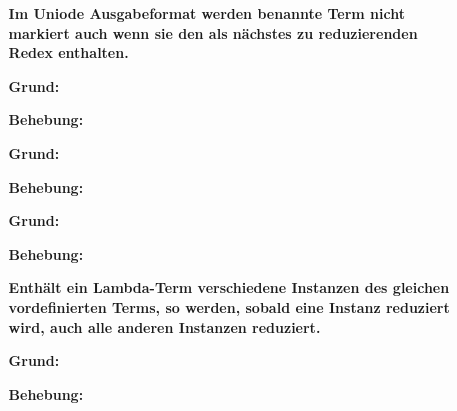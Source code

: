 \documentclass[parskip=full,11pt,openany]{scrreprt}
\begin{document}
\begin{itemize}[itemsep=3ex]
\item[] %
\begin{itemize}[noitemsep]
\item[] {\bfseries Im Uniode Ausgabeformat werden benannte Term nicht markiert auch wenn sie den als nächstes zu reduzierenden Redex enthalten. }
\item [\textbf{Grund:}]
\item [\textbf{Behebung:}]
\end{itemize}

\item[] %
\begin{itemize}[noitemsep]
\item[] {\bfseries  }
\item [\textbf{Grund:}]
\item [\textbf{Behebung:}]
\end{itemize}

\item[] %
\begin{itemize}[noitemsep]
\item[] {\bfseries  }
\item [\textbf{Grund:}]
\item [\textbf{Behebung:}]
\end{itemize}

\item[] %
\begin{itemize}[noitemsep]
\item[] {\bfseries Enthält ein Lambda-Term  verschiedene Instanzen des gleichen vordefinierten Terms, so werden, sobald eine Instanz reduziert wird, auch alle anderen Instanzen reduziert. }
\item [\textbf{Grund:}]
\item [\textbf{Behebung:}]
\end{itemize}

\end{itemize}
\end{document}
